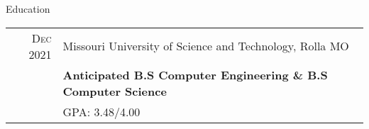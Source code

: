 \documentclass{resume}
\begin{document}



\begin{rSection}{Education}
    \small
    {
        \begin{tabular}{r|p{15cm}}
          \textsc{Dec} 2021 & Missouri University of Science and Technology, Rolla MO  \\ 
           & \textbf{Anticipated B.S Computer Engineering \& B.S Computer Science} \\
                              & GPA: 3.48/4.00 \\
        \end{tabular}
    }
\end{rSection}
\end{document}
